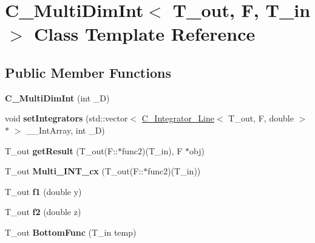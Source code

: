 \hypertarget{class_c___multi_dim_int}{\section{C\-\_\-\-Multi\-Dim\-Int$<$ T\-\_\-out, F, T\-\_\-in $>$ Class Template Reference}
\label{class_c___multi_dim_int}
}
\subsection*{Public Member Functions}
\begin{DoxyCompactItemize}
\item 
\hypertarget{class_c___multi_dim_int_a3f19c7877c12ca00e7a60d6a1108ddd1}{{\bfseries C\-\_\-\-Multi\-Dim\-Int} (int \-\_\-\-D)}\label{class_c___multi_dim_int_a3f19c7877c12ca00e7a60d6a1108ddd1}

\item 
\hypertarget{class_c___multi_dim_int_a2e096d1c862d43e80b0c3935874c69e8}{void {\bfseries set\-Integrators} (std\-::vector$<$ \hyperlink{class_c___integrator___line}{C\-\_\-\-Integrator\-\_\-\-Line}$<$ T\-\_\-out, F, double $>$ $\ast$ $>$ \-\_\-\-\_\-\-Int\-Array, int \-\_\-\-D)}\label{class_c___multi_dim_int_a2e096d1c862d43e80b0c3935874c69e8}

\item 
\hypertarget{class_c___multi_dim_int_a4d164da4c4451c2250a194160d20e944}{T\-\_\-out {\bfseries get\-Result} (T\-\_\-out(F\-::$\ast$func2)(T\-\_\-in), F $\ast$obj)}\label{class_c___multi_dim_int_a4d164da4c4451c2250a194160d20e944}

\item 
\hypertarget{class_c___multi_dim_int_a27a23da8491124cc9ad34faeaa28f679}{T\-\_\-out {\bfseries Multi\-\_\-\-I\-N\-T\-\_\-cx} (T\-\_\-out(F\-::$\ast$func2)(T\-\_\-in))}\label{class_c___multi_dim_int_a27a23da8491124cc9ad34faeaa28f679}

\item 
\hypertarget{class_c___multi_dim_int_a44ff7e453b76ac51ed740a87116cdcbf}{T\-\_\-out {\bfseries f1} (double y)}\label{class_c___multi_dim_int_a44ff7e453b76ac51ed740a87116cdcbf}

\item 
\hypertarget{class_c___multi_dim_int_a65b0ced393b5e532bfc46dcd40e07f3d}{T\-\_\-out {\bfseries f2} (double z)}\label{class_c___multi_dim_int_a65b0ced393b5e532bfc46dcd40e07f3d}

\item 
\hypertarget{class_c___multi_dim_int_aee0b98ae8f663c082c81bd248ebe58e5}{T\-\_\-out {\bfseries Bottom\-Func} (T\-\_\-in temp)}\label{class_c___multi_dim_int_aee0b98ae8f663c082c81bd248ebe58e5}

\end{DoxyCompactItemize}
